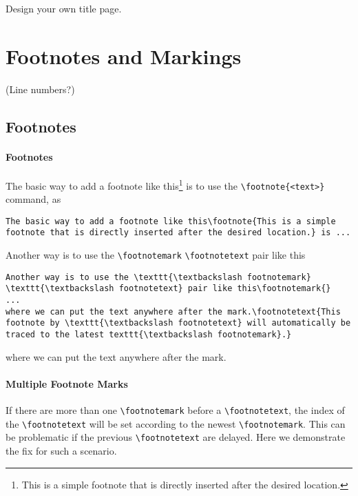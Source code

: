 \begin{exercisebox}
\begin{Exercise}
Design your own title page.
\end{Exercise}
\end{exercisebox}

\section{Footnotes and Markings}

(Line numbers?)

\subsection{Footnotes}

\paragraph{Footnotes}
The basic way to add a footnote like this\footnote{This is a simple footnote that is directly inserted after the desired location.} is to use the \texttt{\textbackslash footnote\allowbreak\{<text>\}} command, as
\begin{lstlisting}
The basic way to add a footnote like this\footnote{This is a simple footnote that is directly inserted after the desired location.} is ...   
\end{lstlisting}
Another way is to use the \texttt{\textbackslash footnotemark} \texttt{\textbackslash footnotetext} pair like this\footnotemark{}
\begin{lstlisting}
Another way is to use the \texttt{\textbackslash footnotemark} \texttt{\textbackslash footnotetext} pair like this\footnotemark{}
...
where we can put the text anywhere after the mark.\footnotetext{This footnote by \texttt{\textbackslash footnotetext} will automatically be traced to the latest texttt{\textbackslash footnotemark}.}
\end{lstlisting}
where we can put the text anywhere after the mark.

\paragraph{Multiple Footnote Marks}
If there are more than one \texttt{\textbackslash footnotemark} before a \texttt{\textbackslash footnotetext}, the index of the \texttt{\textbackslash footnotetext} will be set according to the newest \texttt{\textbackslash footnotemark}. This can be problematic if the previous \texttt{\textbackslash footnotetext} are delayed. Here we demonstrate the fix\footnotemark{} for such a scenario\footnotemark{}.

